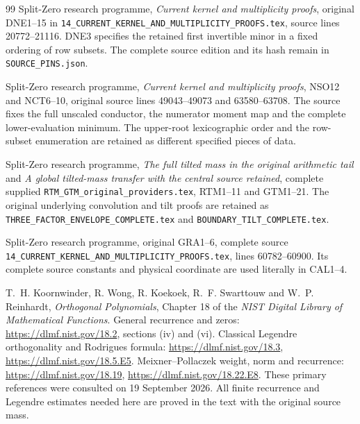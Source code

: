\begin{thebibliography}{99}
Split-Zero research programme, \emph{Current kernel and multiplicity
proofs}, original DNE1--15 in
\texttt{14\_CURRENT\_KERNEL\_AND\_MULTIPLICITY\_PROOFS.tex},
source lines 20772--21116. DNE3 specifies the retained first
invertible minor in a fixed ordering of row subsets. The complete
source edition and its hash remain in \texttt{SOURCE\_PINS.json}.

Split-Zero research programme, \emph{Current kernel and multiplicity
proofs}, NSO12 and NCT6--10, original source lines 49043--49073
and 63580--63708. The source fixes the full unscaled conductor,
the numerator moment map and the complete lower-evaluation minimum.
The upper-root lexicographic order and the row-subset enumeration
are retained as different specified pieces of data.

Split-Zero research programme, \emph{The full tilted mass in the
original arithmetic tail} and \emph{A global tilted-mass transfer
with the central source retained}, complete supplied
\texttt{RTM\_GTM\_original\_providers.tex}, RTM1--11 and GTM1--21.
The original underlying convolution and tilt proofs are retained
as \texttt{THREE\_FACTOR\_ENVELOPE\_COMPLETE.tex} and
\texttt{BOUNDARY\_TILT\_COMPLETE.tex}.

Split-Zero research programme, original GRA1--6, complete source
\texttt{14\_CURRENT\_KERNEL\_AND\_MULTIPLICITY\_PROOFS.tex},
lines 60782--60900. Its complete source constants and physical
coordinate are used literally in CAL1--4.

T.~H. Koornwinder, R. Wong, R. Koekoek, R.~F. Swarttouw and
W.~P. Reinhardt, \emph{Orthogonal Polynomials}, Chapter 18 of the
\emph{NIST Digital Library of Mathematical Functions}.
General recurrence and zeros: \url{https://dlmf.nist.gov/18.2},
sections (iv) and (vi).
Classical Legendre orthogonality and Rodrigues formula:
\url{https://dlmf.nist.gov/18.3},
\url{https://dlmf.nist.gov/18.5.E5}.
Meixner--Pollaczek weight, norm and recurrence:
\url{https://dlmf.nist.gov/18.19},
\url{https://dlmf.nist.gov/18.22.E8}.
These primary references were consulted on 19 September 2026.
All finite recurrence and Legendre estimates needed here are
proved in the text with the original source mass.

\end{thebibliography}
